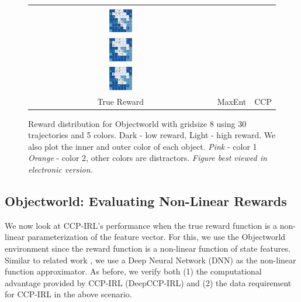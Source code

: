 \documentclass{article}
\def\MSHangBox#1{%
\begin{minipage}[t]{\textwidth}%
\begin{tabbing} %
~\\[-\baselineskip] %
#1 %
\end{tabbing}%
\end{minipage}} %
\begin{document}
\begin{figure}[t]
\centering
  \begin{tabular}{ccc}
    \MSHangBox{\includegraphics[width=0.13\textwidth]{images/objectworld/grid_8_object_20_color_5/reward_map/true_reward_trim.pdf}}&
    \MSHangBox{\includegraphics[width=0.13\textwidth]{images/objectworld/grid_8_object_20_color_5/reward_map/maxent_reward_trim.pdf}}&
    \MSHangBox{\includegraphics[width=0.13\textwidth]{images/objectworld/grid_8_object_20_color_5/reward_map/ccp_reward_trim.pdf}} \\
    True Reward & MaxEnt & CCP \\
    \end{tabular}
    \caption{ Reward distribution for Objectworld with gridsize 8 using 30 trajectories and 5 colors. Dark - low reward, Light - high reward. We also plot the inner and outer color of each object. \textit{Pink} - color 1 \textit{Orange} - color 2, other colors are distractors. \textit{Figure best viewed in electronic version.} }
    \label{fig:img_reward_map_objectworld}
\end{figure}

\subsection{Objectworld: Evaluating Non-Linear Rewards}

We now look at CCP-IRL's performance when the true reward function is a non-linear parameterization of the feature vector.
For this, we use the Objectworld \cite{levine2011nonlinear} environment since the reward function is a non-linear function of state features.
Similar to related work \cite{wulfmeier2015maximum}, we use a Deep Neural Network (DNN) as the non-linear function approximator.
As before, we verify both (1) the computational advantage provided by CCP-IRL (DeepCCP-IRL) and (2) the data requirement for CCP-IRL in the above scenario.
\end{document}
